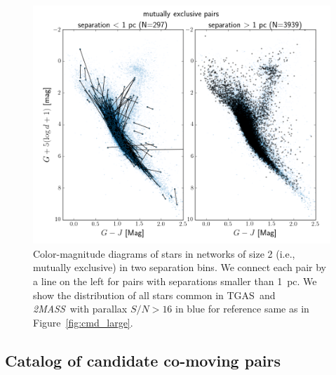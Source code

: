 \documentclass[manuscript, letterpaper]{aastex6}
\newcommand{\project}[1]{\textsl{#1}}
\newcommand{\acronym}[1]{{\small{#1}}}
\newcommand{\tmass}{\project{\acronym{2MASS}}}
\newcommand{\tgas}{\acronym{TGAS}}
\begin{document}
\begin{figure}[htbp]
  \begin{center}
    \includegraphics[width=\textwidth]{figures/gjg_mepairs.png}
  \end{center}
  \caption{
    Color-magnitude diagrams of stars in networks of size 2 (i.e., mutually exclusive)
    in two separation bins.
    We connect each pair by a line on the left for pairs with separations smaller than
    1~pc.
    We show the distribution of all stars common in \tgas\ and \tmass\
    with parallax $S/N>16$ in blue for reference same as in Figure~\ref{fig:cmd_large}.
    \label{fig:cmd_me}}
\end{figure}

\subsection{Catalog of candidate co-moving pairs}
\end{document}
